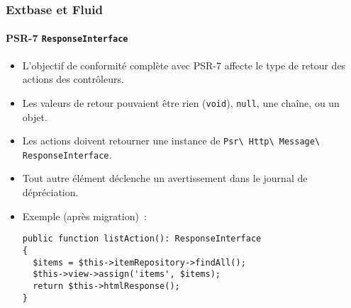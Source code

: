 %

\begin{frame}[fragile]
	\frametitle{Extbase et Fluid}
	\framesubtitle{PSR-7 \texttt{ResponseInterface}}


	\begin{itemize}
		\item L'objectif de conformité complète avec PSR-7 affecte le type de retour
			des actions des contrôleurs.
		\item Les valeurs de retour pouvaient être rien (\small\texttt{void}\normalsize),
			\small\texttt{null}\normalsize, une chaîne, ou un objet.
		\item Les actions doivent retourner une instance de
			\smaller\texttt{Psr\textbackslash
				Http\textbackslash
				Message\textbackslash
				ResponseInterface}.\normalsize
		\item Tout autre élément déclenche un avertissement dans le journal de dépréciation.
		\item Exemple (après migration)~:
\begin{lstlisting}
public function listAction(): ResponseInterface
{
  $items = $this->itemRepository->findAll();
  $this->view->assign('items', $items);
  return $this->htmlResponse();
}
\end{lstlisting}

	\end{itemize}

\end{frame}

